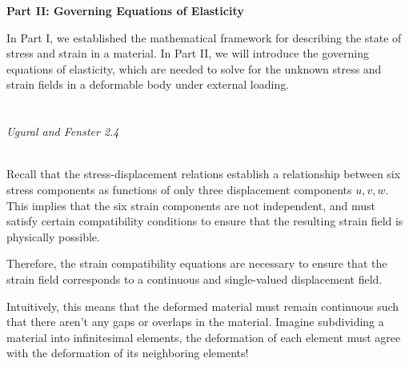 ﻿\documentclass[12pt]{article}
\begin{document}
\newpage
{}
\begin{center}
    {\large\bfseries Part II: Governing Equations of Elasticity\par}
\end{center}
In Part I, we established the mathematical framework for describing the state of stress and strain in a material. In Part II, we will introduce the governing equations of elasticity, which are needed to solve for the unknown stress and strain fields in a deformable body under external loading.

\section*{}
\vspace{-0.5em}
{\small\textit{Ugural and Fenster 2.4}}
\\
Recall that the stress-displacement relations establish a relationship between six stress components as functions of only three displacement components $u,v,w$. This implies that the six strain components are not independent, and must satisfy certain compatibility conditions to ensure that the resulting strain field is physically possible. 

Therefore, the strain compatibility equations are necessary to ensure that the strain field corresponds to a continuous and single-valued displacement field.

Intuitively, this means that the deformed material must remain continuous such that there aren't any gaps or overlaps in the material. Imagine subdividing a material into infinitesimal elements, the deformation of each element must agree with the deformation of its neighboring elements!
\end{document}
